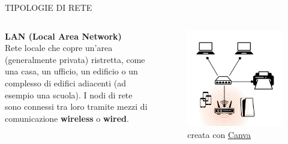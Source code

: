 \documentclass[aspectratio=1610]{beamer}
\begin{document}
\begin{frame}{TIPOLOGIE DI RETE}
    \begin{columns}
            \justifying
            \textbf{LAN (Local Area Network)} \\
            Rete locale che copre un'area (generalmente privata) ristretta, come una casa, un ufficio, un edificio 
            o un complesso di edifici adiacenti (ad esempio una scuola). I nodi di rete sono connessi tra loro tramite mezzi 
            di comunicazione \textbf{wireless} o \textbf{wired}.\\
            \begin{figure}
                \includegraphics[width=\linewidth]{img/lan.png}
                \caption{{creata con \href{https://www.canva.com/}{Canva}}}
            \end{figure}
    \end{columns}
\end{frame}
\end{document}
